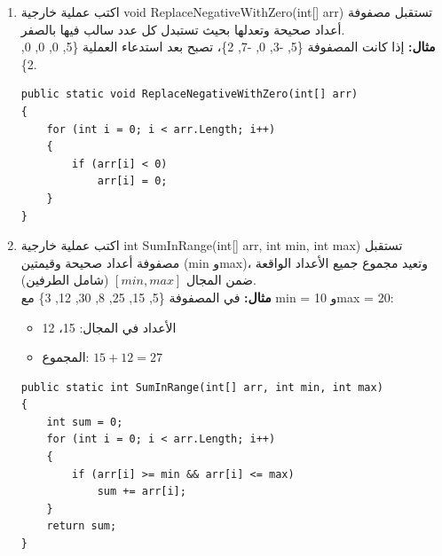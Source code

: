 \documentclass[14pt]{extarticle}
\begin{document}
\begin{enumerate}[resume, itemsep=2em]
\begin{boxSolution}
\begin{english}
\begin{verbatim}
    for (int i = 0; i < arr1.Length; i++)
    {
        if (arr1[i] != arr2[i])
            return false;
    }

    return true;
}
    \end{verbatim}
    \end{english}
    \end{boxSolution}
    \fi

    \item
    اكتب عملية خارجية \textenglish{void ReplaceNegativeWithZero(int[] arr)} تستقبل مصفوفة أعداد صحيحة وتعدلها بحيث تستبدل كل عدد سالب فيها بالصفر.\\
    \textbf{مثال:} إذا كانت المصفوفة \textenglish{\{5, -3, 0, -7, 2\}}، تصبح بعد استدعاء العملية \textenglish{\{5, 0, 0, 0, 2\}}.
    \ifwithsols
    \begin{boxSolution}
    \begin{english}
    \begin{verbatim}
public static void ReplaceNegativeWithZero(int[] arr)
{
    for (int i = 0; i < arr.Length; i++)
    {
        if (arr[i] < 0)
            arr[i] = 0;
    }
}
    \end{verbatim}
    \end{english}
    \end{boxSolution}
    \fi

    \item
    اكتب عملية خارجية \textenglish{int SumInRange(int[] arr, int min, int max)} تستقبل مصفوفة أعداد صحيحة وقيمتين (\textenglish{min} و\textenglish{max})، وتعيد مجموع جميع الأعداد الواقعة ضمن المجال $[min, max]$ (شامل الطرفين).\\
    \textbf{مثال:} في المصفوفة \textenglish{\{5, 15, 25, 8, 30, 12, 3\}} مع \textenglish{min = 10} و\textenglish{max = 20}:
    \begin{itemize}
        \item الأعداد في المجال: 15، 12
        \item المجموع: $15 + 12 = 27$
    \end{itemize}
    \ifwithsols
    \begin{boxSolution}
    \begin{english}
    \begin{verbatim}
public static int SumInRange(int[] arr, int min, int max)
{
    int sum = 0;
    for (int i = 0; i < arr.Length; i++)
    {
        if (arr[i] >= min && arr[i] <= max)
            sum += arr[i];
    }
    return sum;
}
    \end{verbatim}
    \end{english}
    \end{boxSolution}
    \fi


\end{enumerate}
\end{document}
